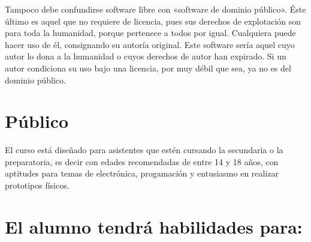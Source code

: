 \documentclass[]{article}
\begin{document}
Tampoco debe confundirse software libre con «software de dominio público». Éste último es aquel que no requiere de licencia, pues sus derechos de explotación son para toda la humanidad, porque pertenece a todos por igual. Cualquiera puede hacer uso de él, consignando su autoría original. Este software sería aquel cuyo autor lo dona a la humanidad o cuyos derechos de autor han expirado. Si un autor condiciona su uso bajo una licencia, por muy débil que sea, ya no es del dominio público.\cite{SL}\\

\section{Público}

El curso está diseñado para asistentes que estén cursando la secundaria o la preparatoria, es decir con edades recomendadas de entre 14 y 18 años, con aptitudes para temas de electrónica, progamación y entusiasmo en realizar prototipos físicos.\\







\section{El alumno tendrá habilidades para:}
\end{document}
